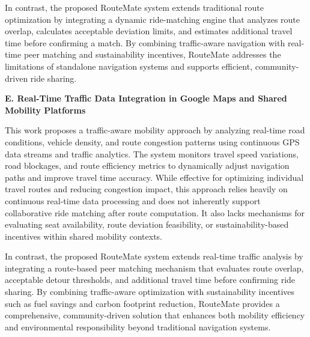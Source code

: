 \documentclass[conference]{IEEEtran}
\begin{document}
In contrast, the proposed RouteMate system extends traditional route optimization by integrating a dynamic ride-matching engine that analyzes route overlap, calculates acceptable deviation limits, and estimates additional travel time before confirming a match. By combining traffic-aware navigation with real-time peer matching and sustainability incentives, RouteMate addresses the limitations of standalone navigation systems and supports efficient, community-driven ride sharing.

\vspace{4pt}
\textbf{E. Real-Time Traffic Data Integration in Google Maps and Shared Mobility Platforms}

\vspace{2pt}
This work proposes a traffic-aware mobility approach by analyzing real-time road conditions, vehicle density, and route congestion patterns using continuous GPS data streams and traffic analytics. The system monitors travel speed variations, road blockages, and route efficiency metrics to dynamically adjust navigation paths and improve travel time accuracy. While effective for optimizing individual travel routes and reducing congestion impact, this approach relies heavily on continuous real-time data processing and does not inherently support collaborative ride matching after route computation. It also lacks mechanisms for evaluating seat availability, route deviation feasibility, or sustainability-based incentives within shared mobility contexts.

In contrast, the proposed RouteMate system extends real-time traffic analysis by integrating a route-based peer matching mechanism that evaluates route overlap, acceptable detour thresholds, and additional travel time before confirming ride sharing. By combining traffic-aware optimization with sustainability incentives such as fuel savings and carbon footprint reduction, RouteMate provides a comprehensive, community-driven solution that enhances both mobility efficiency and environmental responsibility beyond traditional navigation systems.
\end{document}
